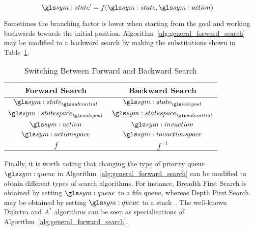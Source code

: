		\begin{equation}
			\state' = f(\state, \action)
		\end{equation}

		Sometimes the branching factor is lower when starting from the goal and
		working backwards towards the initial position.
		Algorithm~\ref{alg:general_forward_search} may be modified to a backward
		search by making the substitutions shown in
		Table~\ref{tab:switiching_between_forward_and_backward_search}.%


		\begin{table}[ht]
			\centering
			\begin{tabular}{c  c}
				\toprule
				Forward Search 			& Backward Search\\
				\midrule
				$\state_{\initial}$		&	$\state_{\goal}$ 			\\
				$\statespace_{\goal}$	&	$\statespace_{\initial}$	\\
				$\action$ 				&	$\invaction$				\\
				$\actionspace$ 			&	$\invactionspace$			\\
				$f$ 					&	$f^{-1}$					\\
			\end{tabular}
			\caption{Switching Between Forward and Backward Search}%
			\label{tab:switiching_between_forward_and_backward_search}
		\end{table}


		Finally, it is worth noting that changing the type of priority queue
		$\queue$ in Algorithm~\ref{alg:general_forward_search} can be modified
		to obtain different types of search algorithms. For instance, Breadth
		First Search is obtained by setting $\queue$ to a \gls{fifo} queue,
		whereas Depth First Search may be obtained by setting $\queue$ to a
		stack~\cite[][page 35]{bib:planning:planning_algorithms}. The well-known
		Dijkstra and $A^*$ algorithms can be seen as specialisations of
		Algorithm~\ref{alg:general_forward_search}.

